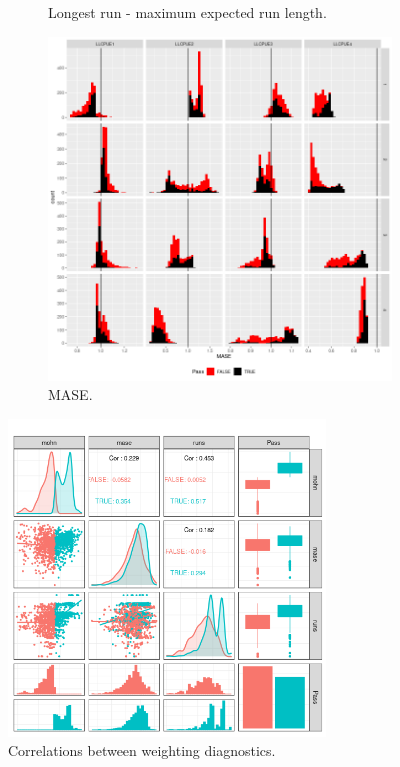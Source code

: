 \begin{figure}
\begin{subfigure}[b]{0.35\textwidth}
    \caption{Longest run - maximum expected run length.}
    \label{fig:runs-long}
    \end{subfigure}%
    \begin{subfigure}[c]{0.35\textwidth}
    \includegraphics[width=\linewidth]{figures/mase-1.png}
    \caption{MASE.}
    \label{fig:mase}
    \end{subfigure}%
 
\caption{}\label{fig:runs}
\end{figure}



\begin{figure}[ht!]\centering\includegraphics[width=0.75\textwidth]{figures/ggpair-1.png} \caption{Correlations between weighting diagnostics.}
\label{fig:wts}       
\end{figure}

